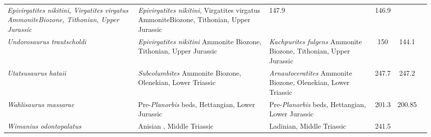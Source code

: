 \begin{longtabu}{>{\itshape}lXXSSl}
        \emph{Epivirgatites nikitini}, Virgatites virgatus AmmoniteBiozone,
        Tithonian, Upper Jurassic                                      &
        \emph{Epivirgatites nikitini}, Virgatites virgatus AmmoniteBiozone,
        Tithonian, Upper Jurassic                                      & 147.9
                                                                       & 146.9
                                                                       &
                                                                       \cite{Efimov1999PZa} \\                    
	Undorosaurus trautscholdi                            &
        \emph{Epivirgatites nikitini} Ammonite Biozone, Tithonian, Upper
        Jurassic                                                          &
        \emph{Kachpurites fulgens} Ammonite Biozone, Tithonian, Upper Jurassic
                                                                          & 150
                                                                          &
        144.1                    & \cite{Arkhangelsky2014PZIR} \\               
	Utatsusaurus hataii                                  &
        \emph{Subcolumbites} Ammonite Biozone, Olenekian, Lower Triassic
                                                             &
        \emph{Arnautoceratites} Ammonite Biozone, Olenekian, Lower Triassic
                                                             & 247.7
                                                             & 247.2
                                                             &
                                                             \cite{Shikama1978SRTUGa} \\                    
	Wahlisaurus massarae                                 &
        Pre-\emph{Planorbis} beds, Hettangian, Lower Jurassic
                                                             &
        Pre-\emph{Planorbis} beds, Hettangian, Lower Jurassic
                                                             & 201.3
                                                             & 200.85
                                                             &
                                                             \cite{Lomax2016JSP} \\                      
	Wimanius odontopalatus                               & Anisian , Middle
        Triassic
                                                             & Ladinian, Middle
        Triassic
                                                             & 241.5

\end{longtabu}
